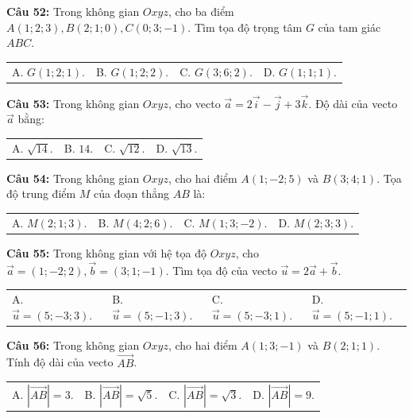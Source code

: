 \documentclass[12pt]{article}
\begin{document}
	\vspace{2mm}
	\noindent \textbf{Câu 52:} Trong không gian $Oxyz$, cho ba điểm $A(1; 2; 3), B(2; 1; 0), C(0; 3; -1)$. Tìm tọa độ trọng tâm $G$ của tam giác $A B C$. \\
	\noindent
	\begin{tabular}{p{} p{} p{} p{}}
		A. $G(1; 2; 1)$. & B. $G(1; 2; 2)$. & C. $G(3; 6; 2)$. & D. $G(1; 1; 1)$.
	\end{tabular}
	
	\vspace{2mm}
	\noindent \textbf{Câu 53:} Trong không gian $Oxyz$, cho vecto $\vec{a} = 2\vec{i} - \vec{j} + 3\vec{k}$. Độ dài của vecto $\vec{a}$ bằng: \\
	\noindent
	\begin{tabular}{p{} p{} p{} p{}}
		A. $\sqrt{14}$. & B. $14$. & C. $\sqrt{12}$. & D. $\sqrt{13}$.
	\end{tabular}
	
	\vspace{2mm}
	\noindent \textbf{Câu 54:} Trong không gian $Oxyz$, cho hai điểm $A(1; -2; 5)$ và $B(3; 4; 1)$. Tọa độ trung điểm $M$ của đoạn thẳng $AB$ là: \\
	\noindent
	\begin{tabular}{p{} p{} p{} p{}}
		A. $M(2; 1; 3)$. & B. $M(4; 2; 6)$. & C. $M(1; 3; -2)$. & D. $M(2; 3; 3)$.
	\end{tabular}
	\noindent \textbf{Câu 55:} Trong không gian với hệ tọa độ $Oxyz$, cho $\vec{a} = (1; -2; 2), \vec{b} = (3; 1; -1)$. Tìm tọa độ của vecto $\vec{u} = 2\vec{a} + \vec{b}$. \\
	\noindent
	\begin{tabular}{p{} p{} p{} p{}}
		A. $\vec{u} = (5; -3; 3)$. & B. $\vec{u} = (5; -1; 3)$. & C. $\vec{u} = (5; -3; 1)$. & D. $\vec{u} = (5; -1; 1)$.
	\end{tabular}
	
	\vspace{2mm}
	\noindent \textbf{Câu 56:} Trong không gian $Oxyz$, cho hai điểm $A(1; 3; -1)$ và $B(2; 1; 1)$. Tính độ dài của vecto $\vec{AB}$. \\
	\noindent
	\begin{tabular}{p{} p{} p{} p{}}
		A. $|\vec{AB}| = 3$. & B. $|\vec{AB}| = \sqrt{5}$. & C. $|\vec{AB}| = \sqrt{3}$. & D. $|\vec{AB}| = 9$.
	\end{tabular}
	
\end{document}
